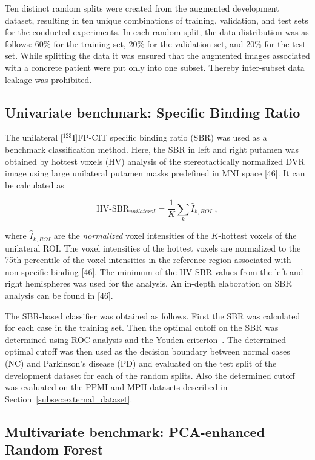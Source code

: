 Ten distinct random splits were created from the augmented development dataset, 
resulting in ten unique combinations of training, validation, and test sets for the conducted experiments.
In each random split, the data distribution was as follows: 
60\% for the training set, 20\% for the validation set, and 20\% for the test set.
While splitting the data it was ensured that the augmented images associated with a concrete patient were put 
only into one subset.
Thereby inter-subset data leakage was prohibited.

\subsection{Univariate benchmark: Specific Binding Ratio}
\label{subsec:sbr}

The unilateral [$^{123}$I]FP-CIT specific binding ratio (SBR) was used as a benchmark classification method.
Here, the SBR in left and right putamen was obtained by hottest voxels (HV) analysis of the stereotactically normalized 
DVR image using large unilateral putamen masks predefined in MNI space [46].
It can be calculated as 

\begin{equation}\label{eq:sbr}
  \text{HV-SBR}_{unilateral} = \frac{1}{K} \sum_{k} \hat{I}_{k, ROI} \;,
\end{equation}

where $\hat{I}_{k, ROI}$ are the \textit{normalized} voxel intensities of the $K$-hottest voxels of the unilateral ROI.
The voxel intensities of the hottest voxels are normalized to the 75th percentile of the voxel intensities 
in the reference region associated with non-specific binding [46].
The minimum of the HV-SBR values from the left and right hemispheres was used for the analysis.
An in-depth elaboration on SBR analysis can be found in [46].

The SBR-based classifier was obtained as follows.
First the SBR was calculated for each case in the training set.
Then the optimal cutoff on the SBR was determined using ROC analysis and the Youden criterion~\citep{Youden1950}.
The determined optimal cutoff was then used as the decision boundary between normal cases (NC) and Parkinson's disease (PD) 
and evaluated on the test split of the development dataset for each of the random splits.
Also the determined cutoff was evaluated on the PPMI and MPH datasets described in Section~\ref{subsec:external_dataset}.

\subsection{Multivariate benchmark: PCA-enhanced Random Forest}
\label{subsec:pca_rfc}

